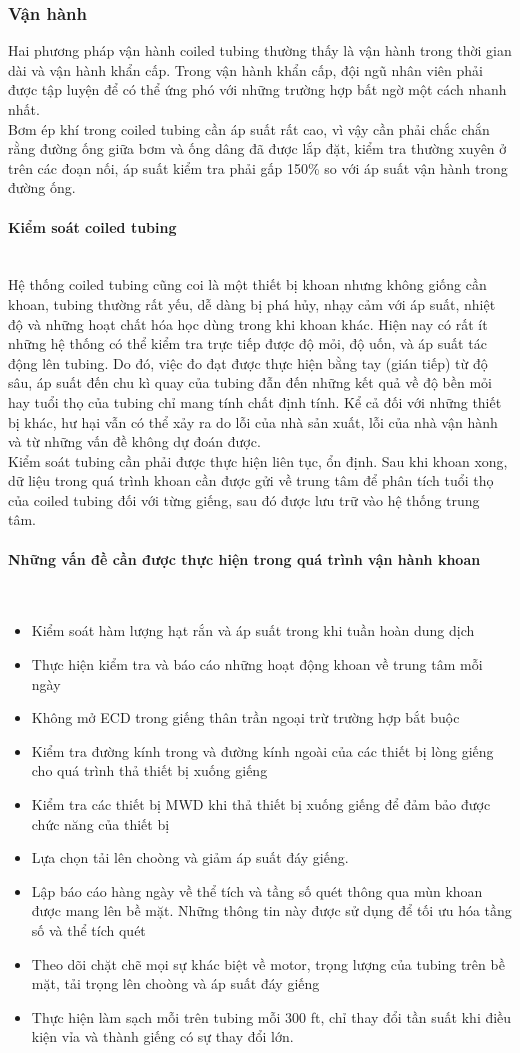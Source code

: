 \documentclass[12pt,a4paper]{article}
\newcommand{\subsubsubsection}[1]{\paragraph{#1}\mbox{}\\}
\begin{document}
\subsubsection{Vận hành}
	Hai phương pháp vận hành coiled tubing thường thấy là vận hành trong thời gian dài và vận hành khẩn cấp. Trong vận hành khẩn cấp, đội ngũ nhân viên phải được tập luyện để có thể ứng phó với những trường hợp bất ngờ một cách nhanh nhất.\\
	Bơm ép khí trong coiled tubing cần áp suất rất cao, vì vậy cần phải chắc chắn rằng đường ống giữa bơm và ống dâng đã được lắp đặt, kiểm tra thường xuyên ở trên các đoạn nối, áp suất kiểm tra phải gấp 150\% so với áp suất vận hành trong đường ống.
	\subsubsubsection{Kiểm soát coiled tubing}
	Hệ thống coiled tubing cũng coi là một thiết bị khoan nhưng không giống cần khoan, tubing thường rất yếu, dễ dàng bị phá hủy, nhạy cảm với áp suất, nhiệt độ và những hoạt chất hóa học dùng trong khi khoan khác. Hiện nay có rất ít những hệ thống có thể kiểm tra trực tiếp được độ mỏi, độ uốn, và áp suất tác động lên tubing. Do đó, việc đo đạt được thực hiện bằng tay (gián tiếp) từ độ sâu, áp suất đến chu kì quay của tubing đẫn đến những kết quả về độ bền mỏi hay tuổi thọ của tubing chỉ mang tính chất định tính. Kể cả đối với những thiết bị khác, hư hại vẫn có thể xảy ra do lỗi của nhà sản xuất, lỗi của nhà vận hành và từ những vấn đề không dự đoán được. \\
	Kiểm soát tubing cần phải được thực hiện liên tục, ổn định. Sau khi khoan xong, dữ liệu trong quá trình khoan cần được gửi về trung tâm để phân tích tuổi thọ của coiled tubing đối với từng giếng, sau đó được lưu trữ vào hệ thống trung tâm.
	\subsubsubsection{Những vấn đề cần được thực hiện trong quá trình vận hành khoan}
	\begin{itemize}
		\item Kiểm soát hàm lượng hạt rắn và áp suất trong khi tuần hoàn dung dịch
		\item Thực hiện kiểm tra và báo cáo những hoạt động khoan về trung tâm mỗi ngày
		\item Không mở ECD trong giếng thân trần ngoại trừ trường hợp bắt buộc
		\item Kiểm tra đường kính trong và đường kính ngoài của các thiết bị lòng giếng cho quá trình thả thiết bị xuống giếng
		\item Kiểm tra các thiết bị MWD khi thả thiết bị xuống giếng để đảm bảo được chức năng của thiết bị
		\item Lựa chọn tải lên choòng và giảm áp suất đáy giếng.
		\item Lập báo cáo hàng ngày về thể tích và tầng số quét thông qua mùn khoan được mang lên bề mặt. Những thông tin này được sử dụng để tối ưu hóa tầng số và thể tích quét
		\item Theo dõi chặt chẽ mọi sự khác biệt về motor, trọng lượng của tubing trên bề mặt, tải trọng lên choòng và áp suất đáy giếng
		\item Thực hiện làm sạch mỗi trên tubing mỗi 300 ft, chỉ thay đổi tần suất khi điều kiện vỉa và thành giếng có sự thay đổi lớn. 
	\end{itemize}
\end{document}
